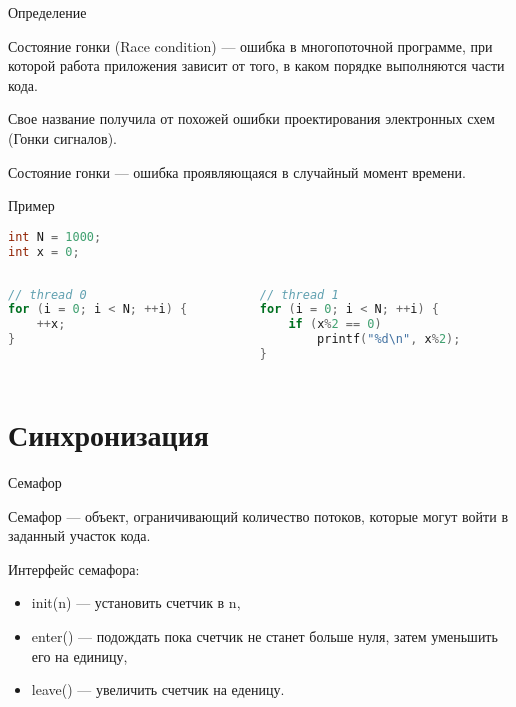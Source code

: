 \begin{frame}{Определение}

Состояние гонки (\abbr Race condition) --- ошибка в многопоточной программе, при которой работа приложения зависит от того, в каком порядке выполняются части кода.

Свое название получила от похожей ошибки проектирования электронных схем (Гонки сигналов).

Состояние гонки --- ошибка проявляющаяся в случайный момент времени.

\end{frame}

\begin{frame}[fragile]{Пример}

\begin{lstlisting}[language=C++,basicstyle=\ttfamily,keywordstyle=\color{blue},basicstyle=\scriptsize]
int N = 1000;
int x = 0;
\end{lstlisting}

\begin{columns}[t]
    \begin{column}[T]{0.45\textwidth}
    \begin{lstlisting}[language=C++,basicstyle=\ttfamily,keywordstyle=\color{blue},basicstyle=\scriptsize]
// thread 0
for (i = 0; i < N; ++i) {
    ++x;
}
    \end{lstlisting}
    \end{column}
    \begin{column}[T]{0.45\textwidth}
    \begin{lstlisting}[language=C++,basicstyle=\ttfamily,keywordstyle=\color{blue},basicstyle=\scriptsize]
// thread 1
for (i = 0; i < N; ++i) {
    if (x%2 == 0)
        printf("%d\n", x%2);
}
    \end{lstlisting}
    \end{column}
\end{columns}

\end{frame}

\section{Синхронизация}

\begin{frame}{Семафор}

Семафор --- объект, ограничивающий количество потоков, которые могут войти в заданный участок кода.

Интерфейс семафора:

\begin{itemize}
    \item init(n) --- установить счетчик в n,
    \item enter() --- подождать пока счетчик не станет больше нуля, затем уменьшить его на единицу,
    \item leave() --- увеличить счетчик на еденицу.
\end{itemize}

\end{frame}


